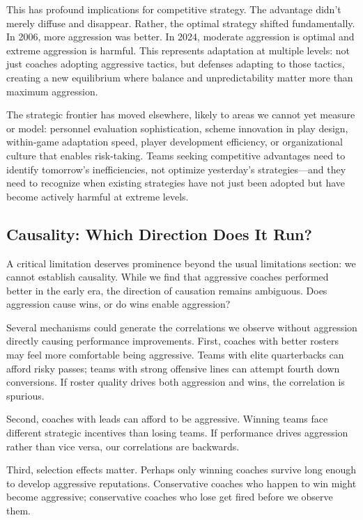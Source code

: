 \documentclass[11pt,twocolumn]{article}
\begin{document}
This has profound implications for competitive strategy. The advantage didn't merely diffuse and disappear. Rather, the optimal strategy shifted fundamentally. In 2006, more aggression was better. In 2024, moderate aggression is optimal and extreme aggression is harmful. This represents adaptation at multiple levels: not just coaches adopting aggressive tactics, but defenses adapting to those tactics, creating a new equilibrium where balance and unpredictability matter more than maximum aggression.

The strategic frontier has moved elsewhere, likely to areas we cannot yet measure or model: personnel evaluation sophistication, scheme innovation in play design, within-game adaptation speed, player development efficiency, or organizational culture that enables risk-taking. Teams seeking competitive advantages need to identify tomorrow's inefficiencies, not optimize yesterday's strategies---and they need to recognize when existing strategies have not just been adopted but have become actively harmful at extreme levels.

\subsection{Causality: Which Direction Does It Run?}

A critical limitation deserves prominence beyond the usual limitations section: we cannot establish causality. While we find that aggressive coaches performed better in the early era, the direction of causation remains ambiguous. Does aggression cause wins, or do wins enable aggression?

Several mechanisms could generate the correlations we observe without aggression directly causing performance improvements. First, coaches with better rosters may feel more comfortable being aggressive. Teams with elite quarterbacks can afford risky passes; teams with strong offensive lines can attempt fourth down conversions. If roster quality drives both aggression and wins, the correlation is spurious.

Second, coaches with leads can afford to be aggressive. Winning teams face different strategic incentives than losing teams. If performance drives aggression rather than vice versa, our correlations are backwards.

Third, selection effects matter. Perhaps only winning coaches survive long enough to develop aggressive reputations. Conservative coaches who happen to win might become aggressive; conservative coaches who lose get fired before we observe them.
\end{document}
